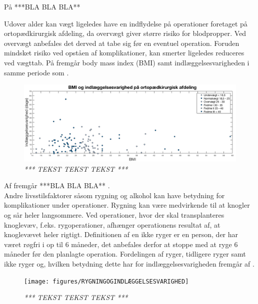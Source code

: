 \noindent
På   ***BLA BLA BLA**




Udover alder kan vægt ligeledes have en indflydelse på operationer foretaget på ortopædkirurgisk afdeling, da overvægt giver større risiko for blodpropper\cite{Ermonds2004}. Ved overvægt anbefales det derved at tabe sig før en eventuel operation. Foruden mindsket risiko ved opståen af komplikationer, kan smerter ligeledes reduceres ved vægttab.\cite{Nordjylland2014} På  fremgår body mass index (BMI) samt indlæggelsesvarigheden i samme periode som .


\begin{figure}[H]
	\flushleft 
	\centering
	\includegraphics[scale=0.55]{figures/BMIogindlaeg}
	\flushleft
	\caption{\textit{ *** TEKST TEKST TEKST *** }}
	\label{BMIogindlaeggelse}
\end{figure}




\noindent
Af  fremgår ***BLA BLA BLA** .\\




\noindent
Andre livsstilsfaktorer såsom rygning og alkohol kan have betydning for komplikationer under operationer. Rygning kan være medvirkende til at knogler og sår heler langsommere. Ved operationer, hvor der skal transplanteres knoglevæv, f.eks. rygoperationer, afhænger operationens resultat af, at knoglevævet heler rigtigt. Definitionen af en ikke ryger er en person, der har været røgfri i op til 6 måneder, det anbefales derfor at stoppe med at ryge 6 måneder før den planlagte operation.\cite{Nordjylland2014} Fordelingen af ryger, tidligere ryger samt ikke ryger og, hvilken betydning dette har for indlæggelsesvarigheden fremgår af .


\begin{figure}[H]
	\flushleft 
	\centering
	\texttt{[image: figures/RYGNINGOGINDLÆGGELSESVARIGHED]}
	\flushleft
	\caption{\textit{ *** TEKST TEKST TEKST *** }}
	\label{rygningogindlaeggelse}
\end{figure}


